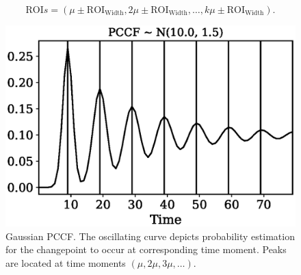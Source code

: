 \begin{equation}\label{eq:rois}
  \text{ROI}s = (\mu \pm \text{ROI}_{\text{Width}}, 2 \mu \pm \text{ROI}_{\text{Width}}, \dots , k \mu \pm \text{ROI}_{\text{Width}}).
\end{equation}
\begin{figure}[htb!]
	\centering
	\includegraphics[scale=0.5]{articles/pics/journal_paper/pccf_example.eps}
	\caption{
    Gaussian PCCF.
		The oscillating curve depicts probability estimation for the changepoint to occur at corresponding time moment.
		Peaks are located at time moments $(\mu, 2 \mu, 3\mu, \dots)$.
	}
	\label{fig:pccf_example}
\end{figure}



